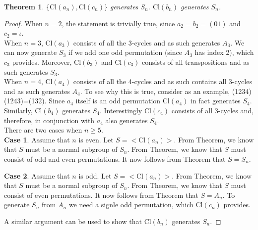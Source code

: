 \documentclass[a4paper,10pt]{article}
\newtheorem{theorem}{Theorem}[section]
\theoremstyle{definition}
\begin{document}
\begin{theorem}
$\{\textrm{Cl}(a_n),\textrm{Cl}(c_n)\}$ generates $S_n$. $\textrm{Cl}(b_n)$ generates $S_n$. 
\end{theorem}
\begin{proof}
When $n=2$, the statement is trivially true, since $a_2 = b_2 = (01)$ and $c_2 = \iota$. \\

When $n=3$, $\textrm{Cl}(a_3)$ consists of all the 3-cycles and as such generates $A_3$. We can now generate $S_3$ if we add one odd permutation (since $A_3$ has index 2), which $c_3$ provides. Moreover, $\textrm{Cl}(b_3)$ and $\textrm{Cl}(c_3)$ consists of all transpositions and as such generates $S_3$.\\

When $n=4$, $\textrm{Cl}(a_4)$ consists of all the 4-cycles and as such contains all 3-cycles and as such generates $A_4$. To see why this is true, consider as an example, (1234)(1243)=(132). Since $a_4$ itself is an odd permutation $\textrm{Cl}(a_4)$ in fact generates $S_4$. Similarly, $\textrm{Cl}(b_4)$ generates $S_4$. Interestingly $\textrm{Cl}(c_4)$ consists of all 3-cycles and, therefore, in conjunction with $a_4$ also generates $S_4$.\\

There are two cases when $n\geq 5$.\\

\textbf{Case 1}. Assume that $n$ is even. Let $S=<\textrm{Cl}(a_n)>$. From Theorem, we know that $S$ must be a normal subgroup of $S_n$. From Theorem, we know that $S$ must consist of odd and even permutations. It now follows from Theorem that $S=S_n$.

\textbf{Case 2}. Assume that $n$ is odd. Let $S=<\textrm{Cl}(a_n)>$. From Theorem, we know that $S$ must be a normal subgroup of $S_n$. From Theorem, we know that $S$ must consist of even permutations. It now follows from Theorem that $S=A_n$. To generate $S_n$ from $A_n$ we need a signle odd permutation, which $\textrm{Cl}(c_n)$ provides.  

A similar argument can be used to show that $\textrm{Cl}(b_n)$ generates $S_n$.
\end{proof}
\end{document}
